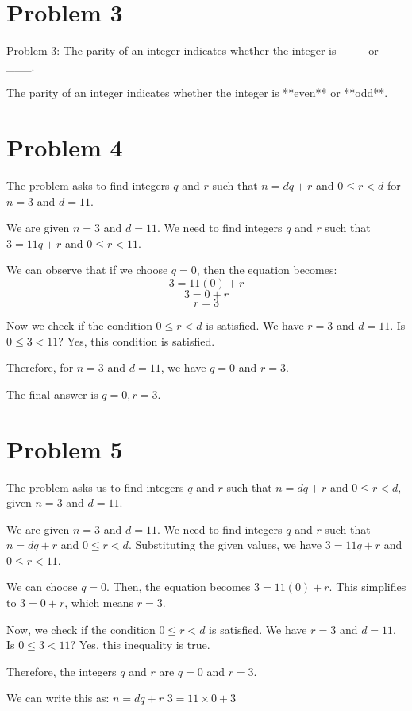 \documentclass{article}
\begin{document}
\newpage

\section*{Problem 3}
Problem 3: The parity of an integer indicates whether the integer is
___ or ___.

The parity of an integer indicates whether the integer is **even** or **odd**.

\newpage

\section*{Problem 4}
The problem asks to find integers $q$ and $r$ such that $n = dq + r$ and $0 \leq r < d$ for $n=3$ and $d=11$.

We are given $n=3$ and $d=11$.
We need to find integers $q$ and $r$ such that $3 = 11q + r$ and $0 \leq r < 11$.

We can observe that if we choose $q=0$, then the equation becomes:
$$3 = 11(0) + r$$
$$3 = 0 + r$$
$$r = 3$$

Now we check if the condition $0 \leq r < d$ is satisfied.
We have $r=3$ and $d=11$.
Is $0 \leq 3 < 11$? Yes, this condition is satisfied.

Therefore, for $n=3$ and $d=11$, we have $q=0$ and $r=3$.

The final answer is $\boxed{q=0, r=3}$.

\newpage

\section*{Problem 5}
The problem asks us to find integers $q$ and $r$ such that $n = dq + r$ and $0 \le r < d$, given $n=3$ and $d=11$.

We are given $n=3$ and $d=11$.
We need to find integers $q$ and $r$ such that $n = dq + r$ and $0 \le r < d$.
Substituting the given values, we have $3 = 11q + r$ and $0 \le r < 11$.

We can choose $q=0$.
Then, the equation becomes $3 = 11(0) + r$.
This simplifies to $3 = 0 + r$, which means $r = 3$.

Now, we check if the condition $0 \le r < d$ is satisfied.
We have $r=3$ and $d=11$.
Is $0 \le 3 < 11$? Yes, this inequality is true.

Therefore, the integers $q$ and $r$ are $q=0$ and $r=3$.

We can write this as:
$n = dq + r$
$3 = 11 \times 0 + 3$
\end{document}
